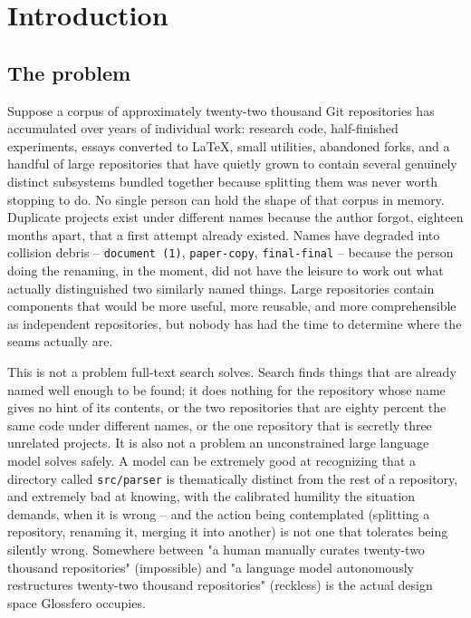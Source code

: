 \documentclass[11pt]{article}
\begin{document}
\newpage

\section{Introduction}

\subsection{The problem}

Suppose a corpus of approximately twenty-two thousand Git repositories has accumulated over years of individual work: research code, half-finished experiments, essays converted to LaTeX, small utilities, abandoned forks, and a handful of large repositories that have quietly grown to contain several genuinely distinct subsystems bundled together because splitting them was never worth stopping to do. No single person can hold the shape of that corpus in memory. Duplicate projects exist under different names because the author forgot, eighteen months apart, that a first attempt already existed. Names have degraded into collision debris -- \texttt{document (1)}, \texttt{paper-copy}, \texttt{final-final} -- because the person doing the renaming, in the moment, did not have the leisure to work out what actually distinguished two similarly named things. Large repositories contain components that would be more useful, more reusable, and more comprehensible as independent repositories, but nobody has had the time to determine where the seams actually are.

This is not a problem full-text search solves. Search finds things that are already named well enough to be found; it does nothing for the repository whose name gives no hint of its contents, or the two repositories that are eighty percent the same code under different names, or the one repository that is secretly three unrelated projects. It is also not a problem an unconstrained large language model solves safely. A model can be extremely good at recognizing that a directory called \texttt{src/parser} is thematically distinct from the rest of a repository, and extremely bad at knowing, with the calibrated humility the situation demands, when it is wrong -- and the action being contemplated (splitting a repository, renaming it, merging it into another) is not one that tolerates being silently wrong. Somewhere between "a human manually curates twenty-two thousand repositories" (impossible) and "a language model autonomously restructures twenty-two thousand repositories" (reckless) is the actual design space Glossfero occupies.
\end{document}
